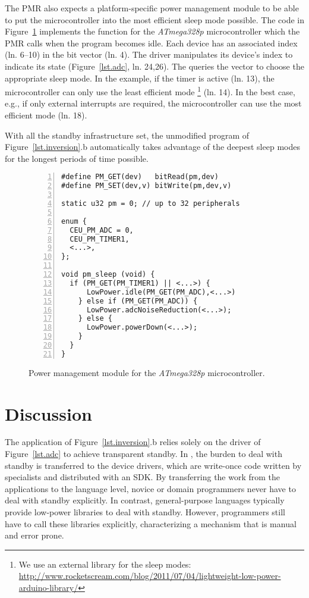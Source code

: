 The PMR also expects a platform-specific power management module to be able to
put the microcontroller into the most efficient sleep mode possible.
%
The code in Figure~\ref{lst.pm} implements the  function for
the \emph{ATmega328p} microcontroller which the PMR calls when the program
becomes idle.
%
Each device has an associated index (ln. 6--10) in the  bit vector
(ln. 4).
%
The driver manipulates its device's index to indicate its state
(Figure~\ref{lst.adc}, ln. 24,26).
%
The  queries the vector to choose the appropriate sleep mode.
In the example, if the timer is active (ln. 13), the microcontroller can only
use the least efficient mode%
\footnote{
    We use an external library for the sleep modes:
    \url{http://www.rocketscream.com/blog/2011/07/04/lightweight-low-power-arduino-library/}
}
(ln. 14).
%
In the best case, e.g., if only external interrupts are required, the
microcontroller can use the most efficient mode (ln. 18).

With all the standby infrastructure set, the unmodified program of
Figure~\ref{lst.inversion}.b automatically takes advantage of the deepest
sleep modes for the longest periods of time possible.

\begin{figure}[t]
\vspace{2mm}
\begin{lstlisting}[numbers=left]
#define PM_GET(dev)   bitRead(pm,dev)
#define PM_SET(dev,v) bitWrite(pm,dev,v)

static u32 pm = 0; // up to 32 peripherals

enum {
  CEU_PM_ADC = 0,
  CEU_PM_TIMER1,
  <...>,
};

void pm_sleep (void) {
  if (PM_GET(PM_TIMER1) || <...>) {
      LowPower.idle(PM_GET(PM_ADC),<...>)
    } else if (PM_GET(PM_ADC)) {
      LowPower.adcNoiseReduction(<...>);
    } else {
      LowPower.powerDown(<...>);
    }
  }
}
\end{lstlisting}
\caption{ Power management module for the \emph{ATmega328p} microcontroller.
\label{lst.pm}
}
\end{figure}

\section{Discussion}

The application of Figure~\ref{lst.inversion}.b relies solely on the driver of
Figure~\ref{lst.adc} to achieve transparent standby.
%
In \CEU, the burden to deal with standby is transferred to the device drivers,
which are write-once code written by specialists and distributed with an SDK.
By transferring the work from the applications to the language level, novice or
domain programmers never have to deal with standby explicitly.
%
In contrast, general-purpose languages typically provide low-power libraries to
deal with standby.
However, programmers still have to call these libraries explicitly,
characterizing a mechanism that is manual and error prone.


